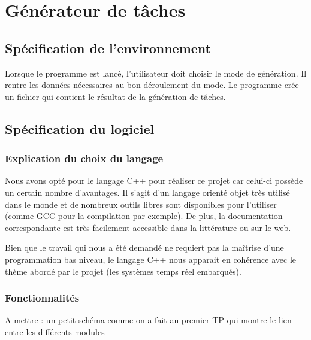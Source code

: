 

\chapter{Générateur de tâches}
	\label{chap:1}
	
	\section{Spécification de l’environnement}
	Lorsque le programme est lancé, l’utilisateur doit choisir le mode de génération. Il rentre les données nécessaires au bon déroulement du mode. Le programme crée un fichier qui contient le résultat de la génération de tâches.


	\section{Spécification du logiciel}

		\subsection{Explication du choix du langage}
	
			\label{sec:langage}
			Nous avons opté pour le langage C++ pour réaliser ce projet car celui-ci possède un certain nombre d'avantages. Il s'agit d'un langage orienté objet très utilisé dans le monde et de nombreux outils libres sont disponibles pour l'utiliser (comme GCC pour la compilation par exemple). De plus, la documentation correspondante est très facilement accessible dans la littérature ou sur le web.
		
			Bien que le travail qui nous a été demandé ne requiert pas la maîtrise d'une programmation bas niveau, le langage C++ nous apparait en cohérence avec le thème abordé par le projet (les systèmes temps réel embarqués).

		\subsection{Fonctionnalités}

			\Huge
			A mettre : un petit schéma comme on a fait au premier TP qui montre le lien entre les différents modules
			\normalsize
		    
